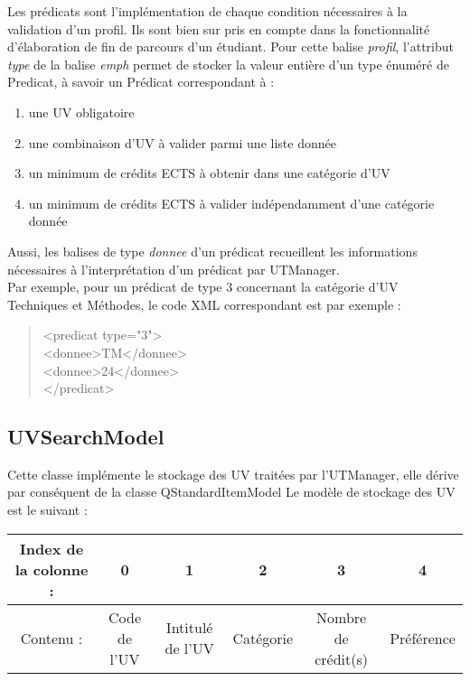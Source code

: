 \documentclass[a4paper,10pt,french]{report}
\begin{document}
	Les prédicats sont l'implémentation de chaque condition nécessaires à la validation d'un profil.
	Ils sont bien sur pris en compte dans la fonctionnalité d'élaboration de fin de parcours d'un étudiant.	
	Pour cette balise \emph{profil}, l'attribut \emph{type} de la balise \emph{emph} permet de stocker la valeur entière d'un type énuméré de Predicat, à savoir un Prédicat correspondant à :
	\begin{enumerate}
	\item une UV obligatoire
	\item une combinaison d'UV à valider parmi une liste donnée
	\item un minimum de crédits ECTS à obtenir dans une catégorie d'UV
	\item un minimum de crédits ECTS à valider indépendamment d'une catégorie donnée
	\end{enumerate}
	Aussi, les balises de type \emph{donnee} d'un prédicat recueillent les informations nécessaires à l'interprétation d'un prédicat par UTManager.\\
	Par exemple, pour un prédicat de type 3 concernant la catégorie d'UV Techniques et Méthodes, le code XML correspondant est par exemple :
	\begin{quote}
<predicat type="3">\\
		\hspace*{1cm}<donnee>TM</donnee>\\
		\hspace*{1cm}<donnee>24</donnee>\\
</predicat>\\
	\end{quote}
	
	
	
	\subsection{UVSearchModel}\label{subsec:UVSearchModel}
	
	Cette classe implémente le stockage des UV traitées par l'UTManager, elle dérive par conséquent de la classe QStandardItemModel
	Le modèle de stockage des UV est le suivant :
	
	\begin{tabular}{|c||c|c|c|c|c|}
	\hline
	Index de la colonne :  & 0 & 1 & 2 & 3 & 4 \\ \hline
	Contenu : & Code de l'UV & Intitulé de l'UV & Catégorie & Nombre de crédit(s) & Préférence \\
	\hline
	\end{tabular}
	
\end{document}
